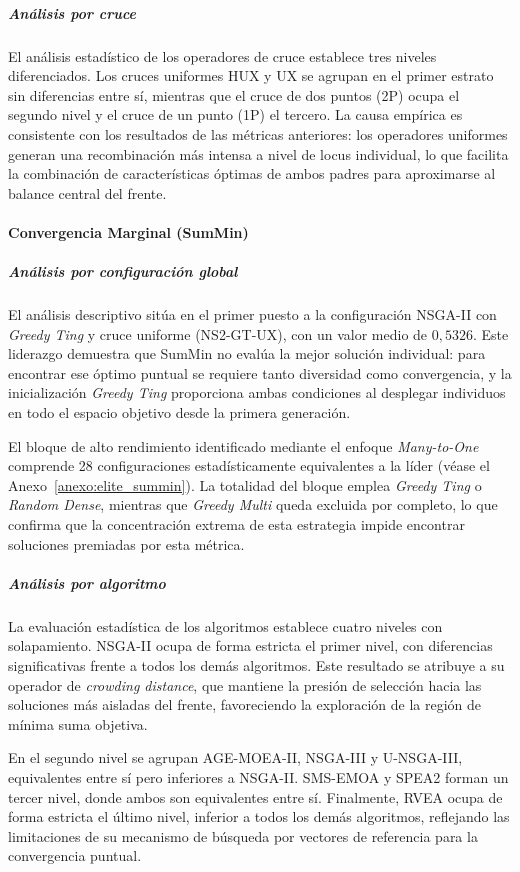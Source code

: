 \subparagraph{Análisis por cruce}

El análisis estadístico de los operadores de cruce establece tres niveles diferenciados. Los cruces uniformes HUX y UX se agrupan en el primer estrato sin diferencias entre sí, mientras que el cruce de dos puntos (2P) ocupa el segundo nivel y el cruce de un punto (1P) el tercero. La causa empírica es consistente con los resultados de las métricas anteriores: los operadores uniformes generan una recombinación más intensa a nivel de locus individual, lo que facilita la combinación de características óptimas de ambos padres para aproximarse al balance central del frente.
\paragraph{Convergencia Marginal (SumMin)}

\subparagraph{Análisis por configuración global}

El análisis descriptivo sitúa en el primer puesto a la configuración NSGA-II con \textit{Greedy Ting} y cruce uniforme (NS2-GT-UX), con un valor medio de $0{,}5326$. Este liderazgo demuestra que SumMin no evalúa la mejor solución individual: para encontrar ese óptimo puntual se requiere tanto diversidad como convergencia, y la inicialización \textit{Greedy Ting} proporciona ambas condiciones al desplegar individuos en todo el espacio objetivo desde la primera generación.

El bloque de alto rendimiento identificado mediante el enfoque \textit{Many-to-One} comprende 28 configuraciones estadísticamente equivalentes a la líder (véase el Anexo~\ref{anexo:elite_summin}). La totalidad del bloque emplea \textit{Greedy Ting} o \textit{Random Dense}, mientras que \textit{Greedy Multi} queda excluida por completo, lo que confirma que la concentración extrema de esta estrategia impide encontrar soluciones premiadas por esta métrica.

\subparagraph{Análisis por algoritmo}

La evaluación estadística de los algoritmos establece cuatro niveles con solapamiento. NSGA-II ocupa de forma estricta el primer nivel, con diferencias significativas frente a todos los demás algoritmos. Este resultado se atribuye a su operador de \textit{crowding distance}, que mantiene la presión de selección hacia las soluciones más aisladas del frente, favoreciendo la exploración de la región de mínima suma objetiva.

En el segundo nivel se agrupan AGE-MOEA-II, NSGA-III y U-NSGA-III, equivalentes entre sí pero inferiores a NSGA-II. SMS-EMOA y SPEA2 forman un tercer nivel, donde ambos son equivalentes entre sí. Finalmente, RVEA ocupa de forma estricta el último nivel, inferior a todos los demás algoritmos, reflejando las limitaciones de su mecanismo de búsqueda por vectores de referencia para la convergencia puntual.

